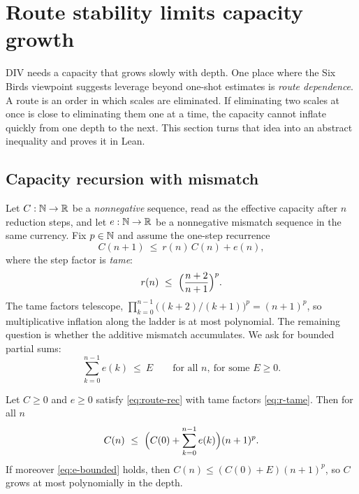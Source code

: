 \section{Route stability limits capacity growth}\label{sec:route-capacity}

DIV needs a capacity that grows slowly with depth. One place where the Six Birds viewpoint suggests
leverage beyond one-shot estimates is \emph{route dependence}. A route is an order in which scales
are eliminated. If eliminating two scales at once is close to eliminating them one at a time, the
capacity cannot inflate quickly from one depth to the next. This section turns that idea into an
abstract inequality and proves it in Lean.

\subsection{Capacity recursion with mismatch}

Let $C:\mathbb{N}\to\mathbb{R}$ be a \emph{nonnegative} sequence, read as the effective capacity after $n$
reduction steps, and let $e:\mathbb{N}\to\mathbb{R}$ be a nonnegative mismatch sequence in the same currency.
Fix $p\in\mathbb{N}$ and assume the one-step recurrence
\begin{equation}\label{eq:route-rec}
C(n+1)\ \le\ r(n)\,C(n)+e(n),
\end{equation}
where the step factor is \emph{tame}:
\begin{equation}\label{eq:r-tame}
r(n)\ \le\ \Bigl(\frac{n+2}{n+1}\Bigr)^p.
\end{equation}
The tame factors telescope, $\prod_{k=0}^{n-1}\bigl((k+2)/(k+1)\bigr)^p=(n+1)^p$, so multiplicative
inflation along the ladder is at most polynomial. The remaining question is whether the additive
mismatch accumulates. We ask for bounded partial sums:
\begin{equation}\label{eq:e-bounded}
\sum_{k=0}^{n-1}e(k)\ \le\ E\qquad\text{for all }n,\ \text{for some }E\ge0.
\end{equation}

\begin{theorem}\label{thm:route-capacity}
Let $C\ge0$ and $e\ge0$ satisfy \eqref{eq:route-rec} with tame factors \eqref{eq:r-tame}. Then for all $n$
\[
C(n)\ \le\ \Bigl(C(0)+\sum_{k=0}^{n-1}e(k)\Bigr)(n+1)^p.
\]
If moreover \eqref{eq:e-bounded} holds, then $C(n)\le(C(0)+E)(n+1)^p$, so $C$ grows at most
polynomially in the depth.
\end{theorem}

